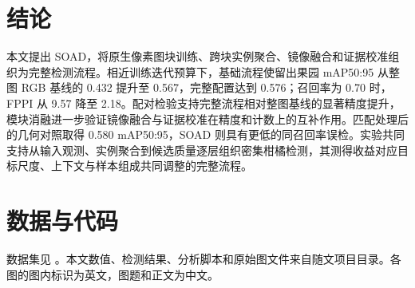 \documentclass[11pt,a4paper]{ctexart}
\begin{document}
\section{结论}
本文提出 SOAD，将原生像素图块训练、跨块实例聚合、镜像融合和证据校准组织为完整检测流程。相近训练迭代预算下，基础流程使留出果园 mAP50:95 从整图 RGB 基线的 0.432 提升至 0.567，完整配置达到 0.576；召回率为 0.70 时，FPPI 从 9.57 降至 2.18。配对检验支持完整流程相对整图基线的显著精度提升，模块消融进一步验证镜像融合与证据校准在精度和计数上的互补作用。匹配处理后的几何对照取得 0.580 mAP50:95，SOAD 则具有更低的同召回率误检。实验共同支持从输入观测、实例聚合到候选质量逐层组织密集柑橘检测，其测得收益对应目标尺度、上下文与样本组成共同调整的完整流程。

\section*{数据与代码}
数据集见 \cite{dataset}。本文数值、检测结果、分析脚本和原始图文件来自随文项目目录。各图的图内标识为英文，图题和正文为中文。
\end{document}
